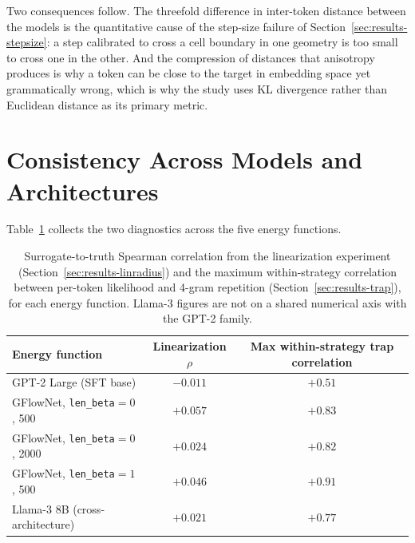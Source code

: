 

Two consequences follow. The threefold difference in inter-token distance between the models is the quantitative cause of the step-size failure of Section~\ref{sec:results-stepsize}: a step calibrated to cross a cell boundary in one geometry is too small to cross one in the other. And the compression of distances that anisotropy produces is why a token can be close to the target in embedding space yet grammatically wrong, which is why the study uses KL divergence rather than Euclidean distance as its primary metric.

\section{Consistency Across Models and Architectures}
\label{sec:results-crossmodel}

Table~\ref{tab:crossmodel} collects the two diagnostics across the five energy functions.

\begin{table}[t]
    \centering
    \small
    \setlength{\tabcolsep}{4pt}
    \begin{tabular}{lcc}
        \toprule
        Energy function & Linearization $\rho$ & Max within-strategy trap correlation \\
        \midrule
        GPT-2 Large (SFT base)              & $-0.011$ & $+0.51$ \\
        GFlowNet, \texttt{len\_beta}$=0$, 500  & $+0.057$ & $+0.83$ \\
        GFlowNet, \texttt{len\_beta}$=0$, 2000 & $+0.024$ & $+0.82$ \\
        GFlowNet, \texttt{len\_beta}$=1$, 500  & $+0.046$ & $+0.91$ \\
        Llama-3 8B (cross-architecture)     & $+0.021$ & $+0.77$ \\
        \bottomrule
    \end{tabular}
    \caption[Two diagnostics across the five energy functions.]{Surrogate-to-truth Spearman correlation from the linearization experiment (Section~\ref{sec:results-linradius}) and the maximum within-strategy correlation between per-token likelihood and 4-gram repetition (Section~\ref{sec:results-trap}), for each energy function. Llama-3 figures are not on a shared numerical axis with the GPT-2 family.}
    \label{tab:crossmodel}
\end{table}

